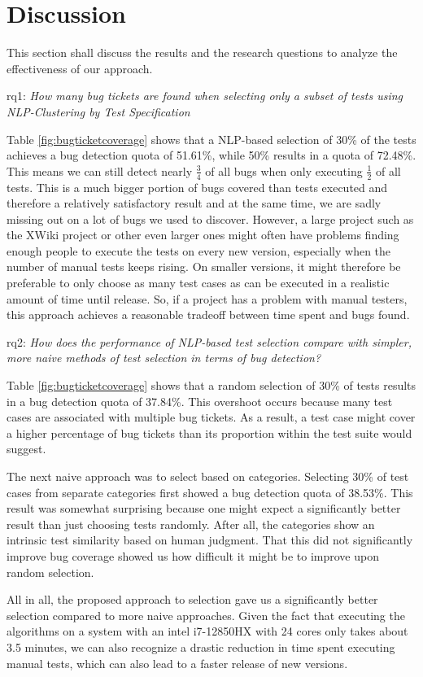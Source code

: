 \section{Discussion}

This section shall discuss the results and the research questions to analyze the effectiveness of our approach.

\ac{rq}1: \emph{How many bug tickets are found when selecting only a subset of tests using NLP-Clustering by Test Specification}

Table \ref{fig:bugticketcoverage} shows that a \ac{NLP}-based selection of 30\% of the tests achieves a bug detection quota of 51.61\%, while 50\% results in a quota of 72.48\%.
This means we can still detect nearly $\frac{3}{4}$ of all bugs when only executing $\frac{1}{2}$ of all tests.
This is a much bigger portion of bugs covered than tests executed and therefore a relatively satisfactory result and at the same time, we are sadly missing out on a lot of bugs we used to discover.
However, a large project such as the XWiki project or other even larger ones might often have problems finding enough people to execute the tests on every new version, especially when the number of manual tests keeps rising. On smaller versions, it might therefore be preferable to only choose as many test cases as can be executed in a realistic amount of time until release.
So, if a project has a problem with manual testers, this approach achieves a reasonable tradeoff between time spent and bugs found.

\ac{rq}2: \emph{How does the performance of NLP-based test selection compare with simpler, more naive methods of test selection in terms of bug detection?}

Table \ref{fig:bugticketcoverage} shows that a random selection of 30\% of tests results in a bug detection quota of 37.84\%. This overshoot occurs because many test cases are associated with multiple bug tickets. As a result, a test case might cover a higher percentage of bug tickets than its proportion within the test suite would suggest.

The next naive approach was to select based on categories. Selecting 30\% of test cases from separate categories first showed a bug detection quota of 38.53\%. This result was somewhat surprising because one might expect a significantly better result than just choosing tests randomly. After all, the categories show an intrinsic test similarity based on human judgment. That this did not significantly improve bug coverage showed us how difficult it might be to improve upon random selection.

All in all, the proposed approach to selection gave us a significantly better selection compared to more naive approaches. Given the fact that executing the algorithms on a system with an intel i7-12850HX with 24 cores only takes about 3.5 minutes, we can also recognize a drastic reduction in time spent executing manual tests, which can also lead to a faster release of new versions.

